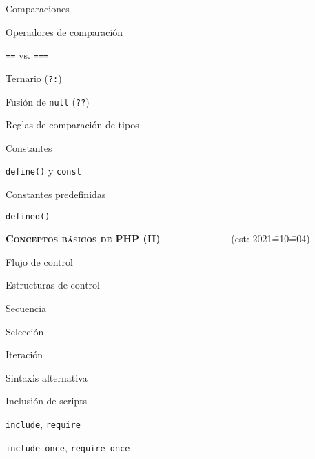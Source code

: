 \begin{longenum}
\begin{longenum}
\begin{longenum}
\begin{longenum}
            \end{longenum}
            \item Comparaciones
            \begin{longenum}
                \item Operadores de comparación
                \item \texttt{==} vs. \texttt{===}
                \item Ternario (\texttt{?:})
                \item Fusión de \texttt{null} (\texttt{??})
                \item Reglas de comparación de tipos
            \end{longenum}
        \end{longenum}
        \item Constantes
        \begin{longenum}
            \item \texttt{define()} y \texttt{const}
            \item Constantes predefinidas
            \item \texttt{defined()}
        \end{longenum}
    \end{longenum}
    \item \textbf{\textsc{Conceptos básicos de PHP (II)}} \ \ \ \ \ \ \ \ \ \ \ \ \ \ (est: 2021\==10\==04)
    \begin{longenum}
        \item Flujo de control
        \begin{longenum}
            \item Estructuras de control
            \begin{longenum}
                \item Secuencia
                \item Selección
                \item Iteración
                \item Sintaxis alternativa
            \end{longenum}
            \item Inclusión de scripts
            \begin{longenum}
                \item \texttt{include}, \texttt{require}
                \item \texttt{include\_once}, \texttt{require\_once}

\end{longenum}
\end{longenum}
\end{longenum}
\end{longenum}

